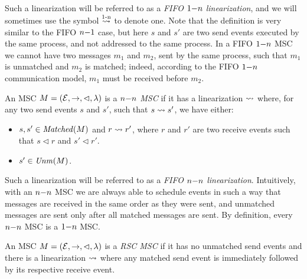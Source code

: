 Such a linearization will be referred to as a \emph{FIFO $1\mathsf{-}n$ linearization}, and we will sometimes use the symbol $\overset{\text{1-n}}{\rightsquigarrow}$ to denote one. Note that the definition is very similar to the FIFO $n\mathsf{-}1$ case, but here $s$ and $s'$ are two send events executed by the same process, and not addressed to the same process. In a FIFO $1\mathsf{-}n$ MSC we cannot have two messages $m_1$ and $m_2$, sent by the same process, such that $m_1$ is unmatched and $m_2$ is matched; indeed, according to the FIFO $1\mathsf{-}n$ communication model, $m_1$ must be received before $m_2$.


\begin{definition}\label{def:n_n}
	An MSC $M = (\mathcal{E},\to,\lhd,\lambda)$ is a \emph{$n\mathsf{-}n$ MSC} if it has a linearization $\rightsquigarrow$ where, for any two send events $s$ and $s'$, such that $s \rightsquigarrow s'$, we have either:
	\begin{itemize}\itemsep=0.5ex
		\item $s,s' \in \mathit{Matched}(M)$ and $r \rightsquigarrow r'$, where $r$ and $r'$ are two receive events such that $s \lhd r$ and $s' \lhd r'$.
		\item $s' \in \mathit{Unm}(M)$.
	\end{itemize}
\end{definition}

Such a linearization will be referred to as a \emph{FIFO $n\mathsf{-}n$ linearization}. Intuitively, with an $n\mathsf{-}n$ MSC we are always able to schedule events in such a way that messages are received in the same order as they were sent, and unmatched messages are sent only after all matched messages are sent. By definition, every $n\mathsf{-}n$ MSC is a $1\mathsf{-}n$ MSC. 

\begin{definition}\label{def:rsc}
	An MSC $M = (\mathcal{E},\to,\lhd,\lambda)$ is a \emph{RSC MSC} if it has no unmatched send events and there is a linearization $\rightsquigarrow$ where any matched send event is immediately followed by its respective receive event.
\end{definition}



